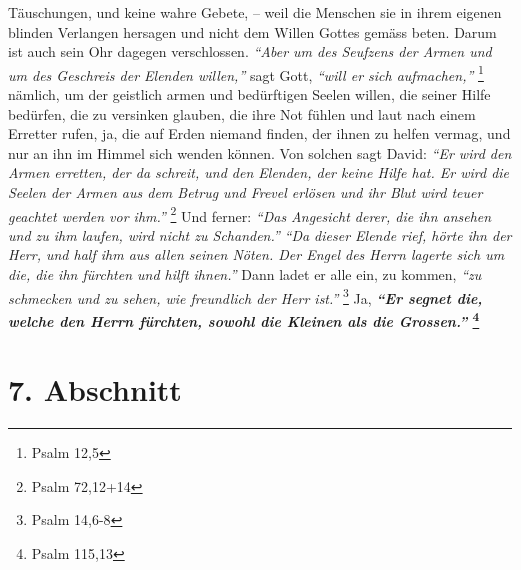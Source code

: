 Täuschungen, und keine wahre Gebete, -- weil die Menschen sie in ihrem eigenen
blinden Verlangen hersagen und nicht dem Willen Gottes 
gemäss beten. Darum ist
auch sein Ohr dagegen verschlossen.
\textit{"`Aber um des Seufzens der Armen und um des Geschreis der Elenden
willen,"'}
sagt Gott,
\textit{"`will er sich aufmachen,"'}
\footnote{Psalm 12,5}
nämlich, um der geistlich armen und bedürftigen
Seelen willen, die seiner Hilfe bedürfen, die zu versinken glauben, die ihre
Not fühlen und laut nach einem Erretter rufen, ja, die auf Erden niemand
finden, der ihnen zu helfen vermag, und nur an ihn im Himmel sich wenden
können. Von solchen sagt David:
\textit{"`Er wird den Armen erretten, der da schreit,
und den Elenden, der keine Hilfe hat. Er wird die Seelen der Armen aus dem
Betrug und Frevel erlösen und ihr Blut wird teuer geachtet werden vor
ihm."'}
\footnote{Psalm 72,12+14}
Und ferner:
\textit{"`Das Angesicht derer, die ihn ansehen und zu ihm laufen, wird nicht zu
Schanden."'}
\textit{"`Da dieser Elende rief, hörte ihn der Herr, und half ihm aus allen
seinen Nöten. Der Engel des Herrn lagerte sich um die, die ihn fürchten und
hilft ihnen."'}
Dann ladet er alle ein, zu kommen,
\textit{"`zu schmecken und zu sehen, wie freundlich der Herr ist."'}
\footnote{Psalm 14,6-8}
Ja, \textbf{\textit{"`Er segnet die, welche den Herrn fürchten,
sowohl die Kleinen als
die Grossen."'}
\footnote{Psalm 115,13}}

\section{7. Abschnitt} \label{kap6_ab7}

